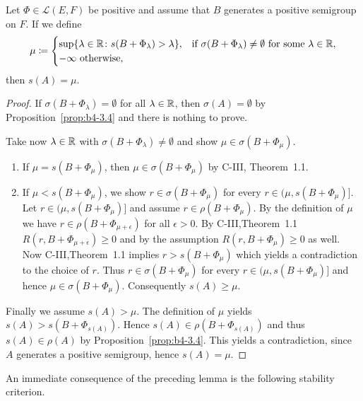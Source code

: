 \begin{lemma*} 
	Let  $\Phi \in \mathcal{L}(E,F)$  be positive and assume that  $B$ generates a positive semigroup on  $F$. 
	If we define
	\[
	\mu \coloneq 
	\begin{cases}
		\sup\{\lambda \in \mathbb{R} \colon s(B+\Phi_{\lambda}) > \lambda\},  & \text{if } \sigma(B+\Phi_{\lambda}) \neq \emptyset \text{ for some } \lambda \in \mathbb{R}, \\
		-\infty   \text{ otherwise}, &
	\end{cases}
	\]
	then  $s(A) = \mu$.
\end{lemma*}	
\begin{proof}
If $\sigma(B+\Phi_{\lambda}) = \emptyset$ for all $\lambda \in \mathbb{R}$, then $\sigma(A) = \emptyset$ by Proposition~\ref{prop:b4-3.4} and there is nothing to prove.

Take now $\lambda \in \mathbb{R}$ with $\sigma(B+\Phi_{\lambda}) \neq \emptyset$ and show $\mu \in \sigma(B+\Phi_{\mu})$.
\begin{enumerate}[label={Case~\arabic*: }, wide, labelindent=0em]
\item 
If $\mu = s(B+\Phi_{\mu})$, then $\mu \in \sigma(B+\Phi_{\mu})$ by C-III, Theorem~1.1.

\item 
If $\mu < s(B+\Phi_{\mu})$, we show $r \in \sigma(B+\Phi_{\mu})$ for every $r \in (\mu,s(B+\Phi_{\mu})]$.
Let $r \in (\mu,s(B+\Phi_{\mu})]$ and assume $r \in \rho(B+\Phi_{\mu})$. 
By the definition of $\mu$ we have $r \in \rho(B+\Phi_{\mu+\epsilon})$ for all $\epsilon > 0$. 
By C-III,Theorem~1.1 $R(r,B+\Phi_{\mu+\epsilon}) \geq 0$ and by the assumption $R(r,B+\Phi_{\mu}) \geq 0$ as well. 
Now C-III,Theorem~1.1 implies $r > s(B+\Phi_{\mu})$ which yields a contradiction to the choice of $r$. 
Thus $r \in \sigma(B+\Phi_{\mu})$ for every $r \in (\mu,s(B+\Phi_{\mu})]$ and hence $\mu \in \sigma(B+\Phi_{\mu})$. 
Consequently $s(A) \geq \mu$.
\end{enumerate}

Finally we assume $s(A) > \mu$. 
The definition of $\mu$ yields $s(A) > s(B+\Phi_{s(A)})$. 
Hence $s(A) \in \rho(B+\Phi_{s(A)})$ and thus $s(A) \in \rho(A)$ by Proposition~\ref{prop:b4-3.4}. 
This yields a contradiction, since $A$ generates a positive semigroup, hence $s(A) = \mu$.
\end{proof}
An immediate consequence of the preceding lemma is the following stability criterion.

